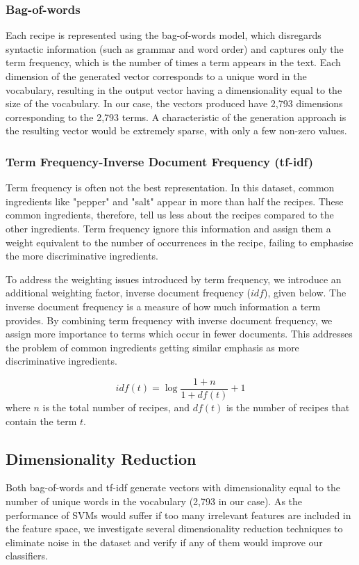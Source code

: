 \documentclass{article}
\begin{document}
\subsubsection*{Bag-of-words}
Each recipe is represented using the bag-of-words model, which disregards syntactic information (such as grammar and word order) and captures only the term frequency, which is the number of times a term appears in the text. Each dimension of the generated vector corresponds to a unique word in the vocabulary, resulting in the output vector having a dimensionality equal to the size of the vocabulary. In our case, the vectors produced have 2,793 dimensions corresponding to the 2,793 terms. A characteristic of the generation approach is the resulting vector would be extremely sparse, with only a few non-zero values.

\subsubsection*{Term Frequency-Inverse Document Frequency (tf-idf)}
Term frequency is often not the best representation. In this dataset, common ingredients like "pepper" and "salt" appear in more than half the recipes. These common ingredients, therefore, tell us less about the recipes compared to the other ingredients. Term frequency ignore this information and assign them a weight equivalent to the number of occurrences in the recipe, failing to emphasise the more discriminative ingredients.

To address the weighting issues introduced by term frequency, we introduce an additional weighting factor, inverse document frequency ($idf$), given below. The inverse document frequency is a measure of how much information a term provides. By combining term frequency with inverse document frequency, we assign more importance to terms which occur in fewer documents. This addresses the problem of common ingredients getting similar emphasis as more discriminative ingredients.

$$ idf(t) = \log{\dfrac{1 + n}{1 + df(t)}} + 1 $$
where $n$ is the total number of recipes, and $df(t)$ is the number of recipes that contain the term $t$. 

\subsection{Dimensionality Reduction}
Both bag-of-words and tf-idf generate vectors with dimensionality equal to the number of unique words in the vocabulary (2,793 in our case). As the performance of SVMs would suffer if too many irrelevant features are included in the feature space, we investigate several dimensionality reduction techniques to eliminate noise in the dataset and verify if any of them would improve our classifiers.
\end{document}

